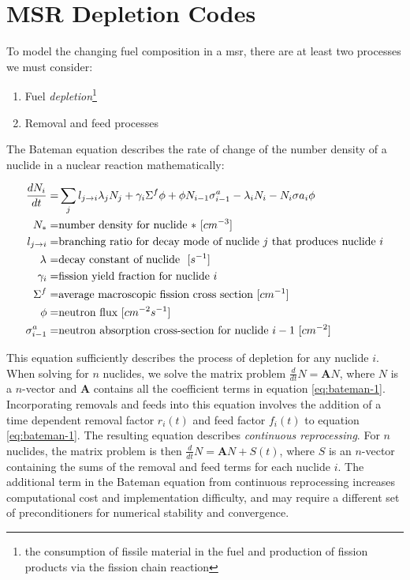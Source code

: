 \section{MSR Depletion Codes}%
\label{sec:msr_codes}

To model the changing fuel composition in a \Gls{msr}, there are at least two processes we must consider:
\begin{enumerate}
    \item Fuel {\it depletion}\footnote{the consumption of fissile material in the fuel and production of fission products via the fission chain reaction}
    \item Removal and feed processes
\end{enumerate}

The Bateman equation describes the rate of change of the number density of a nuclide in a nuclear reaction mathematically:

\begin{align}
    \label{eq:bateman-1}
    \frac{dN_{i}}{dt} =& \sum_{j} l_{j\to i}\lambda_{j} N_{j} + \gamma_{i} \Sigma^{f}\phi + \phi N_{i-1} \sigma^{a}_{i-1} - \lambda_{i}N_{i} - N_{i}\sigma{a}_{i}\phi\\
    N_{*} =& \text{number density for nuclide $*$ $[cm^{-3}]$}\nonumber\\
    l_{j\to i} =& \text{branching ratio for decay mode of nuclide $j$ that produces nuclide $i$}\nonumber\\
    \lambda_{\*} =& \text{decay constant of nuclide $\*$ $[s^{-1}]$}\nonumber\\
    \gamma_{i} =& \text{fission yield fraction for nuclide $i$}\nonumber \\
    \Sigma^{f} =& \text{average macroscopic fission cross section $[cm^{-1}]$}\nonumber\\
    \phi =& \text{neutron flux $[cm^{-2}s^{-1}]$}\nonumber\\
    \sigma^{a}_{i-1} =& \text{neutron absorption cross-section for nuclide $i-1$ $[cm^{-2}]$}\nonumber\\
\end{align}
    
This equation sufficiently describes the process of depletion for any nuclide $i$. When solving for $n$ nuclides, we solve the matrix problem $\frac{d}{dt}N = \mathbf{A}N$, where $N$ is a $n$-vector and $\mathbf{A}$ contains all the coefficient terms in equation \ref{eq:bateman-1}. Incorporating removals and feeds into this equation involves the addition of a time dependent removal factor $r_{i}(t)$ and feed factor $f_{i}(t)$ to equation \ref{eq:bateman-1}. The resulting equation describes {\it continuous reprocessing}.
For $n$ nuclides, the matrix problem is then $\frac{d}{dt}N = \mathbf{A}N + S(t)$, where $S$ is an $n$-vector containing the sums of the removal and feed terms for each nuclide $i$. The additional term in the Bateman equation from continuous reprocessing increases computational cost and implementation difficulty, and may require a different set of preconditioners for numerical stability and convergence.

